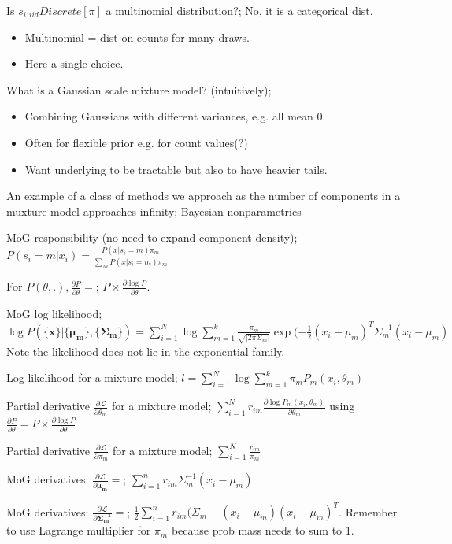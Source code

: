\documentclass{article}
\begin{document}
Is $s_i~_{iid}Discrete[\pi]$ a multinomial distribution?; No, it is a categorical dist. \begin{itemize} \item Multinomial = dist on counts for many draws.  \item Here a single choice.  \end{itemize}

What is a Gaussian scale mixture model? (intuitively); \begin{itemize} \item Combining Gaussians with different variances, e.g. all mean 0.  \item Often for flexible prior e.g. for count values(?) \item Want underlying to be tractable but also to have heavier tails.  \end{itemize}

An example of a class of methods we approach as the number of components in a muxture model approaches infinity; Bayesian nonparametrics

MoG responsibility (no need to expand component density); $P(s_i=m|x_i) = \frac{P(x|s_i=m)\pi_m}{\sum_m P(x|s_i=m)\pi_m}$

For $P(\theta, .), \frac{\partial P}{\partial \theta} =$; $P\times \frac{\partial\log P}{\partial \theta}$.

MoG log likelihood; $\log P(\{\mathbf{x}\}|\{\mathbf{\mu_m} \},\{\mathbf{\Sigma_m} \}) = \sum_{i=1}^N\log \sum_{m=1}^k \frac{\pi_m}{\sqrt{|2\pi\Sigma_m|}}\exp(-\frac{1}{2}(x_i-\mu_m)^T\Sigma^{-1}_m(x_i-\mu_m)$ \newline Note the likelihood does not lie in the exponential family.

Log likelihood for a mixture model; $l=\sum_{i=1}^N\log \sum_{m=1}^k \pi_mP_m(x_i, \theta_m)$

Partial derivative $\frac{\partial \mathcal{L}}{\partial \theta_m}$ for a mixture model; $\sum_{i=1}^N r_{im} \frac{\partial\log P_m(x_i, \theta_m)}{\partial\theta_m}$ using $\frac{\partial P}{\partial \theta} = P \times \frac{\partial\log P}{\partial \theta}$

Partial derivative $\frac{\partial \mathcal{L}}{\partial \pi_m}$ for a mixture model; $\sum_{i=1}^N \frac{r_{im}}{\pi_m}$

MoG derivatives: $\frac{\partial \mathcal{L}}{\partial \mathbf{\mu_m}} =$; $\sum_{i=1}^n r_{im}\Sigma^{-1}_m(x_i-\mu_m)$

MoG derivatives: $\frac{\partial \mathcal{L}}{\partial \mathbf{\Sigma^{-1}_m}} =$; $\frac{1}{2}\sum_{i=1}^n r_{im}(\Sigma_m-(x_i-\mu_m)(x_i-\mu_m)^T$. \newline Remember to use Lagrange multiplier for $\pi_m$ because prob mass needs to sum to 1.
\end{document}
